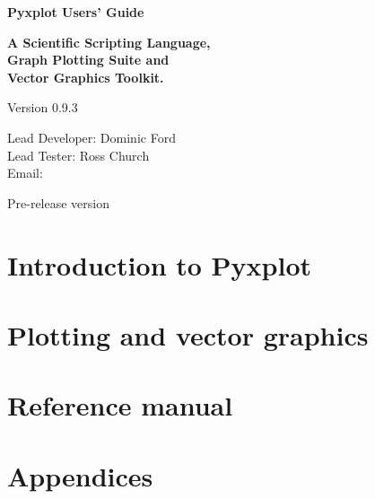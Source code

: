 \documentclass[a4paper,onecolumn,11pt]{book}
\def\version{0.9.3}
\def\reldate{Pre-release version}
\begin{document}
\begin{titlepage}
\normalsize
\begin{center}
{\Huge \bf Pyxplot Users' Guide}\\
\end{center}
\newline
\begin{center}
{\LARGE \bf A Scientific Scripting Language, \\ Graph Plotting Suite and \\ Vector Graphics Toolkit. \\}
\end{center}
\newline
\begin{center}
{\Large Version \version \\}
\end{center}
\newline
\begin{center}
{\large
Lead Developer: Dominic Ford \\
\vspace{1mm}
Lead Tester: Ross Church \\
\vspace{2mm}
Email:  \\
}
\end{center}
\newline
\begin{center}
{\Large \reldate \\}
\end{center}
\end{titlepage}

\part{Introduction to Pyxplot}







\part{Plotting and vector graphics}
\setcounter{chapter}{7}



\part{Reference manual}
\setcounter{chapter}{10}









\part{Appendices}
\appendix





\printindex
\end{document}
